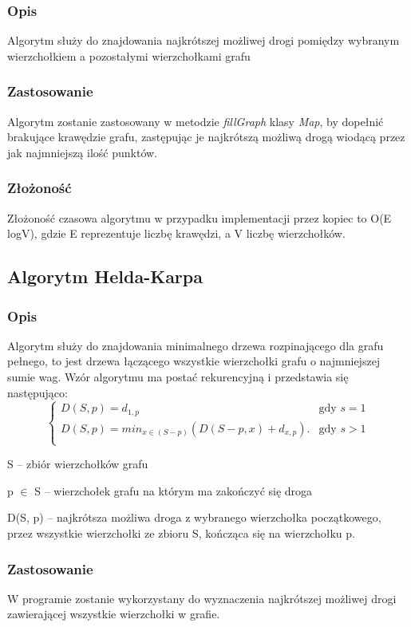 \documentclass{article}
\begin{document}
\subsubsection{Opis}
Algorytm służy do znajdowania najkrótszej możliwej drogi pomiędzy wybranym wierzchołkiem a pozostałymi wierzchołkami grafu
\subsubsection{Zastosowanie}
Algorytm zostanie zastosowany w metodzie \textit{fillGraph} klasy \textit{Map}, by dopełnić brakujące krawędzie grafu, zastępując je najkrótszą możliwą drogą wiodącą przez jak najmniejszą ilość punktów. 

\subsubsection{Złożoność}
Złożoność czasowa algorytmu w przypadku implementacji przez kopiec to O(E logV), gdzie E reprezentuje liczbę krawędzi, a V liczbę wierzchołków.

\subsection{Algorytm Helda-Karpa}

\subsubsection{Opis}
Algorytm służy do znajdowania minimalnego drzewa rozpinającego dla grafu pełnego, to jest drzewa łączącego wszystkie wierzchołki grafu o najmniejszej sumie wag. Wzór algorytmu ma postać rekurencyjną i przedstawia się następująco:\\
$$
\left\{ \begin{array}{ll}
D(S, p) = d_{1,p} & \textrm{gdy $s=1$}\\
D(S, p) = min_{x \in (S-{p})}( D(S-{p}, x) + d_{x,p}). & \textrm{gdy $s>1$}\\
\end{array} \right.
$$
    
S -- zbiór wierzchołków grafu
    
p $\in$ S -- wierzchołek grafu na którym ma zakończyć się droga
    
D(S, p) -- najkrótsza możliwa droga z wybranego wierzchołka początkowego, przez wszystkie wierzchołki ze zbioru S, kończąca się na wierzchołku p.

\subsubsection{Zastosowanie}
W programie zostanie wykorzystany do wyznaczenia najkrótszej możliwej drogi zawierającej wszystkie wierzchołki w grafie.
\end{document}
